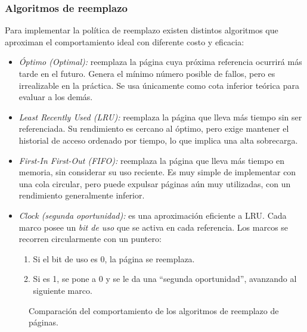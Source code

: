 \subsubsection{Algoritmos de reemplazo}

Para implementar la política de reemplazo existen distintos algoritmos que aproximan el comportamiento ideal con diferente costo y eficacia:

\begin{itemize}
  \item \textit{Óptimo (Optimal):} reemplaza la página cuya próxima referencia ocurrirá más tarde en el futuro. Genera el mínimo número posible de fallos, pero es irrealizable en la práctica. Se usa únicamente como cota inferior teórica para evaluar a los demás.

  \item \textit{Least Recently Used (LRU):} reemplaza la página que lleva más tiempo sin ser referenciada. Su rendimiento es cercano al óptimo, pero exige mantener el historial de acceso ordenado por tiempo, lo que implica una alta sobrecarga.

  \item \textit{First-In First-Out (FIFO):} reemplaza la página que lleva más tiempo en memoria, sin considerar su uso reciente. Es muy simple de implementar con una cola circular, pero puede expulsar páginas aún muy utilizadas, con un rendimiento generalmente inferior.

  \item \textit{Clock (segunda oportunidad):} es una aproximación eficiente a LRU. Cada marco posee un \textit{bit de uso} que se activa en cada referencia. Los marcos se recorren circularmente con un puntero:
  \begin{enumerate}
    \item Si el bit de uso es 0, la página se reemplaza.
    \item Si es 1, se pone a 0 y se le da una ``segunda oportunidad'', avanzando al siguiente marco.
  \end{enumerate}
\end{itemize}

\begin{figure}[!ht]
  \centering
  \caption{Comparación del comportamiento de los algoritmos de reemplazo de páginas.}
\end{figure}


